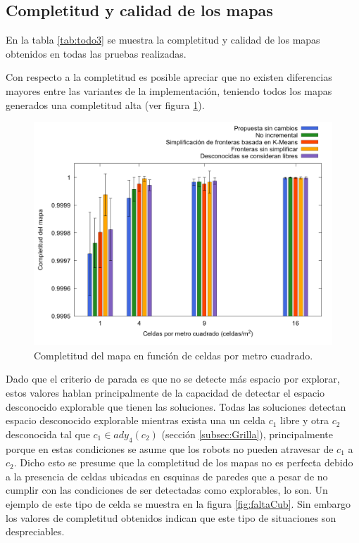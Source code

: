 \subsection{Completitud y calidad de los mapas} \label{sec:exp:cubcal}



En la tabla \ref{tab:todo3} se muestra la completitud y calidad de los mapas
obtenidos en todas las pruebas realizadas. 



Con respecto a la completitud es posible apreciar que no existen diferencias
mayores entre las variantes de la implementación, teniendo todos los mapas
generados una completitud alta (ver figura \ref{fig:gra:todo:compl}).
\begin{figure}[!h]
  \centerfloat
  \includegraphics[clip=true, width=\graphlen]{imagenes/graficas_chicas_nuevas/graficas_histo_num/completeness_9995/map_completeness.png}
  \caption{Completitud del mapa en función de celdas por metro cuadrado.}\label{fig:gra:todo:compl}
\end{figure}
Dado que el criterio de parada es que no se
detecte más espacio por explorar, estos valores hablan principalmente de la
capacidad de detectar el espacio desconocido explorable que tienen las
soluciones. Todas las soluciones detectan espacio desconocido explorable
mientras exista una un celda $c_1$ libre y otra $c_2$ desconocida tal que $c_1
\in ady_4(c_2)$ (sección \ref{subsec:Grilla}), principalmente porque en estas
condiciones se asume que los robots no pueden atravesar de $c_1$ a $c_2$. Dicho
esto se presume que la completitud de los mapas no es perfecta debido a la
presencia de celdas ubicadas en esquinas de paredes que a pesar de no
cumplir con las condiciones de ser detectadas como explorables, lo son. Un
ejemplo de este tipo de celda se muestra en la figura \ref{fig:faltaCub}. Sin
embargo los valores de completitud obtenidos indican que este tipo de
situaciones son despreciables.

